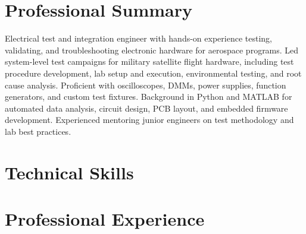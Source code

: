 \documentclass[letterpaper,11pt]{moderncv}
\begin{document}
\makeletterclosing

\newpage

\makecvtitle
\vspace{-3em}

\section{Professional Summary}
Electrical test and integration engineer with hands-on experience testing, validating, and troubleshooting electronic hardware for aerospace programs. Led system-level test campaigns for military satellite flight hardware, including test procedure development, lab setup and execution, environmental testing, and root cause analysis. Proficient with oscilloscopes, DMMs, power supplies, function generators, and custom test fixtures. Background in Python and MATLAB for automated data analysis, circuit design, PCB layout, and embedded firmware development. Experienced mentoring junior engineers on test methodology and lab best practices.

\section{Technical Skills}
\begin{minipage}[t]{0.48\textwidth}
\end{minipage}%
\hfill
\begin{minipage}[t]{0.48\textwidth}
\end{minipage}

\section{Professional Experience}
\end{document}
